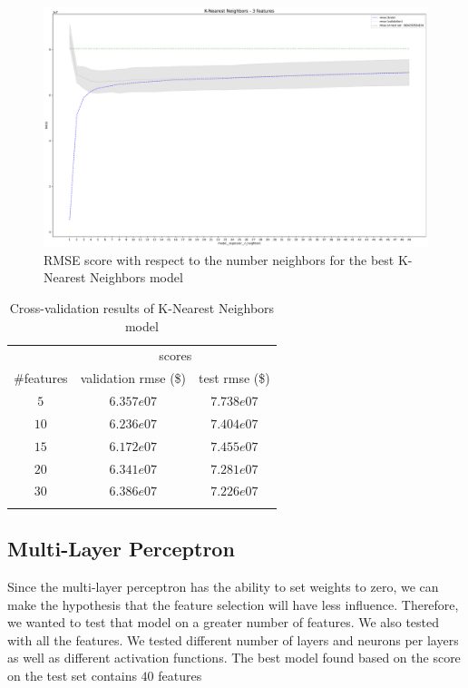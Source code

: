 \begin{figure}[H]
	\centering
	\includegraphics{figures/knn_eval.pdf}
	\caption{RMSE score with respect to the number neighbors for the best K-Nearest Neighbors model}
	\label{fig:knn_eval}
\end{figure}

\begin{table}[H]
	\centering
	\begin{tabular}{ccc} \toprule
	  & \multicolumn {2}{c}{scores} \\\cmidrule(lr) {2-3}
	  \#features         & validation rmse (\$)             & test rmse (\$) \\\hline
	  $5$        		& $6.357e07$                      	& $7.738e07$ \\
	  $10$        		& $6.236e07$                        & $7.404e07$ \\
	  $15$        		& $6.172e07$                        & $7.455e07$ \\
	  $20$             	& $6.341e07$                        & $7.281e07$ \\
	  $30$             	& $6.386e07$                        & $7.226e07$ \\
	  \\\hline
	\end{tabular}
	\caption{Cross-validation results of K-Nearest Neighbors model}
	\label{tab:knn-results}
\end{table}

\subsection{Multi-Layer Perceptron}

Since the multi-layer perceptron has the ability to set weights to zero, we can make the hypothesis that the feature selection will have less influence. Therefore, we wanted to test that model on a greater number of features. We also tested with all the features. We tested different number of layers and neurons per layers as well as different activation functions. The best model found based on the score on the test set contains $40$ features

